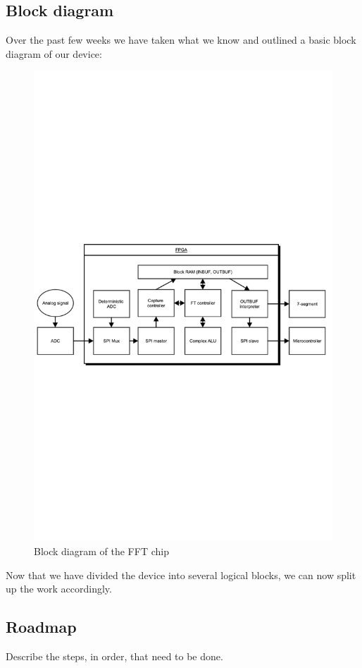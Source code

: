 \documentclass[12pt]{article}
\begin{document}
  \subsection*{Block diagram}
    Over the past few weeks we have taken what we know and outlined a basic block diagram of our device:
    \begin{figure}[H]
      \centering
      \includegraphics[trim=0 400 0 400,clip,width=140mm]{vhdl_fft.pdf}
      \caption{Block diagram of the FFT chip}
      \label{overflow}
    \end{figure}
    Now that we have divided the device into several logical blocks, we can now split up the work accordingly.
  \subsection*{Roadmap}
    Describe the steps, in order, that need to be done.
\end{document}
